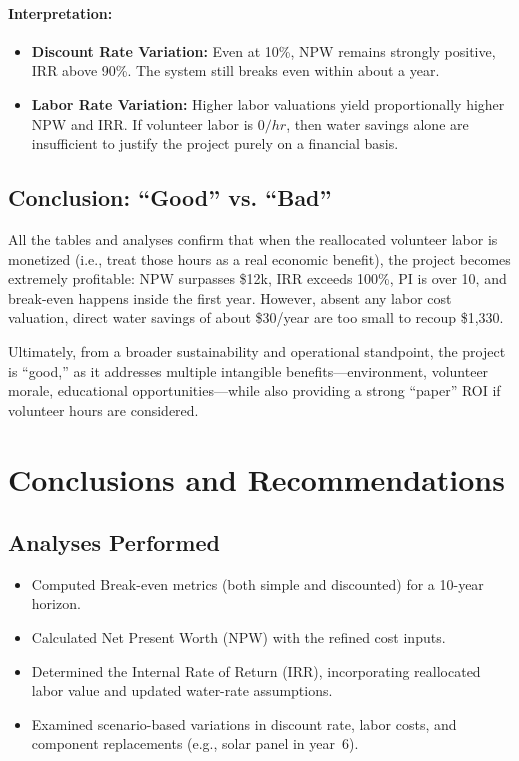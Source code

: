 \documentclass[12pt]{article}
\begin{document}
\paragraph{Interpretation:}
\begin{itemize}
    \item \textbf{Discount Rate Variation:} Even at 10\%, NPW remains strongly positive, IRR above 90\%. The system still breaks even within about a year.
    \item \textbf{Labor Rate Variation:} Higher labor valuations yield proportionally higher NPW and IRR. If volunteer labor is $0/hr$, then water savings alone are insufficient to justify the project purely on a financial basis.
\end{itemize}

\subsection*{Conclusion: ``Good'' vs. ``Bad''}
All the tables and analyses confirm that when the reallocated volunteer labor is monetized (i.e., treat those hours as a real economic benefit), the project becomes extremely profitable: NPW surpasses \$12k, IRR exceeds 100\%, PI is over 10, and break-even happens inside the first year. However, absent any labor cost valuation, direct water savings of about \$30/year are too small to recoup \$1,330. 

Ultimately, from a broader sustainability and operational standpoint, the project is “good,” as it addresses multiple intangible benefits—environment, volunteer morale, educational opportunities—while also providing a strong “paper” ROI if volunteer hours are considered.

\newpage

\section*{Conclusions and Recommendations}
\vspace{-0.5em}

\subsection*{Analyses Performed}
\begin{itemize}
    \item Computed Break-even metrics (both simple and discounted) for a 10-year horizon.
    \item Calculated Net Present Worth (NPW) with the refined cost inputs.
    \item Determined the Internal Rate of Return (IRR), incorporating reallocated labor value and updated water-rate assumptions.
    \item Examined scenario-based variations in discount rate, labor costs, and component replacements (e.g., solar panel in year~6).
\end{itemize}
\end{document}
